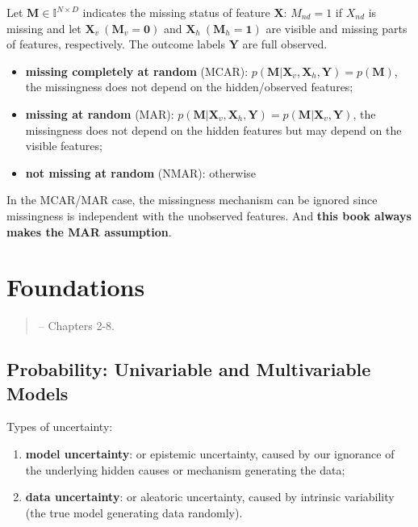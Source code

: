 Let $\bm{M}\in\mathbb{I}^{N\times{D}}$ indicates the missing status of feature $\bm{X}$:
$M_{nd}=1$ if $X_{nd}$ is missing and let $\bm{X}_v~(\bm{M}_v=\bm{0})$ and 
$\bm{X}_h~(\bm{M}_h=\bm{1})$ 
are visible and missing parts of features, respectively. 
The outcome labels $\mathbf{Y}$ are full observed.
\begin{itemize}
    \item \textbf{missing completely at random} (MCAR): 
    $p(\bm{M}|\bm{X}_v,\bm{X}_h,\bm{Y})=p(\bm{M})$,
    the missingness does not depend on the hidden/observed features;
    \item \textbf{missing at random} (MAR):
    $p(\bm{M}|\bm{X}_v,\bm{X}_h,\bm{Y})
    =p(\bm{M}|\bm{X}_v,\bm{Y})$,
    the missingness does not depend on the hidden features but may depend on the visible features;
    \item \textbf{not missing at random} (NMAR): otherwise
\end{itemize}

\begin{note}
    In the MCAR/MAR case, the missingness mechanism can be ignored since missingness is
    independent with the unobserved features. 
    And \textbf{this book always makes the MAR assumption}.
\end{note}

\section{Foundations}
\begin{quote}
    \citep{pml1Book} -- Chapters 2-8.
\end{quote}

\subsection{Probability: Univariable and Multivariable Models}

Types of uncertainty:
\begin{enumerate}
    \item \textbf{model uncertainty}: or epistemic uncertainty,
    caused by our ignorance of the underlying hidden causes or mechanism generating the data;
    \item \textbf{data uncertainty}: or aleatoric uncertainty,
    caused by intrinsic variability (the true model generating data randomly).
\end{enumerate}


